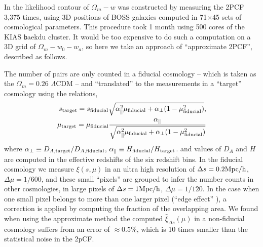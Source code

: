 \documentclass{natureprintstyle}
\begin{document}
In \cite{Li2016} the likelihood contour of $\Omega_m-w$ was constructed by
measuring the 2PCF 3,375 times,
using 3D positions of BOSS galaxies computed in 71$\times$45 sets of cosmological parameters.
This procedure took 1 month using 500 cores of the KIAS {\texttt baekdu} cluster.
It would be too expensive to do such a computation on a 3D grid of $\Omega_m-w_0-w_a$,
so here we take an approach  of ``approximate 2PCF'', described as follows.

The number of pairs are only counted in a fiducial cosmology
-- which is taken as the $\Omega_m=0.26$ $\Lambda$CDM --
and ``translated'' to the measurements in a ``target'' cosmology using the relations, 
\begin{eqnarray}
 s_{\rm target} = s_{\rm fiducial} \sqrt{\alpha_{\parallel}^2 \mu_{\rm fiducial}+\alpha_{\bot}(1-\mu_{\rm fiducial}^2)}, \\
 \mu_{\rm target} = \mu_{\rm fiducial} \frac{\alpha_\parallel}
 {\sqrt{\alpha_{\parallel}^2 \mu_{\rm fiducial} +\alpha_{\bot}(1-\mu_{\rm fiducial}^2)}}
\end{eqnarray}
where $\alpha_{\bot}\equiv D_{A,\rm target}/D_{A,\rm fiducial}$,
$\alpha_{\parallel}\equiv H_{\rm fiducial}/H_{\rm target}$.
and values of $D_A$ and $H$ are computed in the effective redshifts of the six redshift bins.
In the fiducial cosmology
we measure $\xi(s,\mu)$ in an ultra high resolution of
$\Delta s = 0.2 {\rm Mpc/h}$, $\Delta \mu = 1/600$,
and these small ``pixels'' are grouped to infer 
the number counts in other cosmologies, 
in large pixels of $\Delta s = 1 {\rm Mpc/h}$, $\Delta \mu = 1/120$.
In the case when one small pixel belongs to more than one larger pixel (``edge effect'' ),
a correction is applied by computing the fraction of the overlapping area.
We found when using the approximate method the computed 
$\hat\xi_{\Delta s}(\mu)$ in a non-fiducial cosmology suffers from
an error of $\approx0.5\%$, which is 10 times smaller than 
the statistical noise in the 2pCF.
\end{document}
